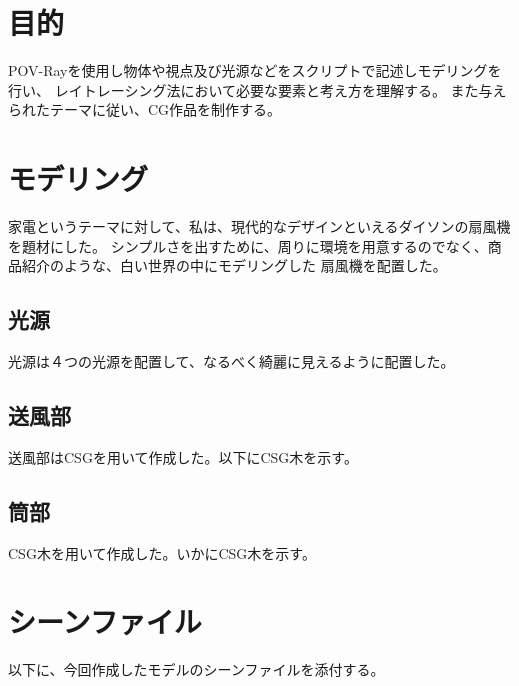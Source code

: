 \documentclass[11pt,a4j]{jsarticle}
\begin{document}


\section{目的}
POV-Rayを使用し物体や視点及び光源などをスクリプトで記述しモデリングを行い、
レイトレーシング法において必要な要素と考え方を理解する。
また与えられたテーマに従い、CG作品を制作する。


\section{モデリング}
\label{sec:モデリング}

家電というテーマに対して、私は、現代的なデザインといえるダイソンの扇風機を題材にした。
シンプルさを出すために、周りに環境を用意するのでなく、商品紹介のような、白い世界の中にモデリングした
扇風機を配置した。

\subsection{光源}
光源は４つの光源を配置して、なるべく綺麗に見えるように配置した。


\subsection{送風部}

送風部はCSGを用いて作成した。以下にCSG木を示す。
\vspace{15cm}


\subsection{筒部}

CSG木を用いて作成した。いかにCSG木を示す。
\vspace{15cm}





\section{シーンファイル}
\label{sec:シーンファイル}

以下に、今回作成したモデルのシーンファイルを添付する。
\end{document}
